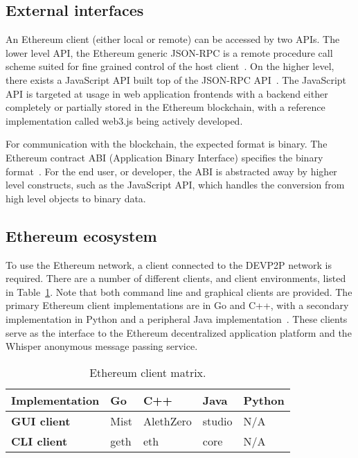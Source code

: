 \subsection{External interfaces}
An Ethereum client (either local or remote) can be accessed by two APIs. The lower level API, the Ethereum generic JSON-RPC is a remote procedure call scheme suited for fine grained control of the host client~\cite{generic-json-rpc}. On the higher level, there exists a JavaScript API built top of the JSON-RPC API~\cite{javascript-api}. The JavaScript API is targeted at usage in web application frontends with a backend either completely or partially stored in the Ethereum blockchain, with a reference implementation called web3.js being actively developed.

For communication with the blockchain, the expected format is binary. The Ethereum contract ABI (Application Binary Interface) specifies the binary format~\cite{ethereum-contract-abi}. For the end user, or developer, the ABI is abstracted away by higher level constructs, such as the JavaScript API, which handles the conversion from high level objects to binary data.

\subsection{Ethereum ecosystem}
To use the Ethereum network, a client connected to the DEVP2P network is required. There are a number of different clients, and client environments, listed in Table~\ref{eth-clients}. Note that both command line and graphical clients are provided. The primary Ethereum client implementations are in Go and C++, with a secondary implementation in Python and a peripheral Java implementation~\cite{github-goeth}\cite{github-cppeth}\cite{github-javaeth}\cite{github-pyeth}. These clients serve as the interface to the Ethereum decentralized application platform and the Whisper anonymous message passing service.

\begin{table}[ht]
\centering
\caption{Ethereum client matrix.}
\label{eth-clients}
\begin{tabular}{|l|l|l|l|l|}
\hline \textbf{Implementation} & Go & C++ & Java & Python \\ \hline
\textbf{GUI client} & Mist & AlethZero & studio & N/A \\ \hline 
\textbf{CLI client} & geth & eth & core & N/A \\ \hline
\end{tabular}
\end{table}

